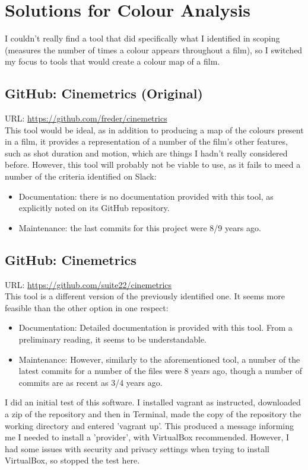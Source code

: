 \documentclass{article}
\begin{document}
\section*{Solutions for Colour Analysis}
I couldn't really find a tool that did specifically what I identified in scoping (measures the number of times a colour appears throughout a film), so I switched my focus to tools that would create a colour map of a film.

\subsection{GitHub: Cinemetrics (Original)}
URL: \url{https://github.com/freder/cinemetrics}\\
This tool would be ideal, as in addition to producing a map of the colours present in a film, it provides a representation of a number of the film's other features, such as shot duration and motion, which are things I hadn't really considered before. However, this tool will probably not be viable to use, as it fails to meed a number of the criteria identified on Slack: 
\begin{itemize}
    \item Documentation: there is no documentation provided with this tool, as explicitly noted on its GitHub repository.
    \item Maintenance: the last commits for this project were 8/9 years ago.
\end{itemize}

\subsection{GitHub: Cinemetrics}
URL: \url{https://github.com/suite22/cinemetrics}\\
This tool is a different version of the previously identified one. It seems more feasible than the other option in one respect:

\begin{itemize}
    \item Documentation: Detailed documentation is provided with this tool. From a preliminary reading, it seems to be understandable.
    \item Maintenance: However, similarly to the aforementioned tool, a number of the latest commits for a number of the files were 8 years ago, though a number of commits are as recent as 3/4 years ago.
\end{itemize}
I did an initial test of this software. I installed vagrant as instructed, downloaded a zip of the repository and then in Terminal, made the copy of the repository the working directory and entered 'vagrant up'. This produced a message informing me I needed to install a 'provider', with VirtualBox recommended. However, I had some issues with security and privacy settings when trying to install VirtualBox, so stopped the test here.
\end{document}
